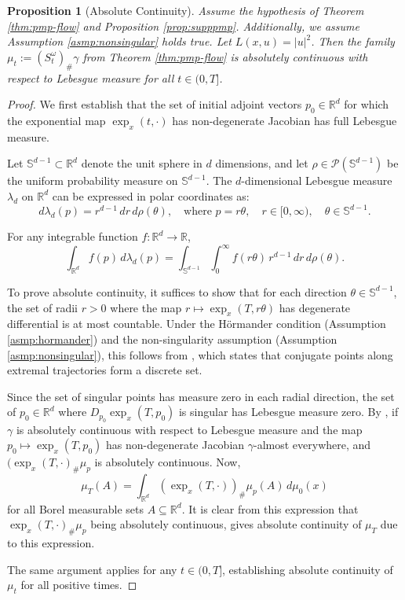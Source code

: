 \documentclass{article}
\newtheorem{proposition}[theorem]{Proposition}
\newcommand{\Rd}{\mathbb{R}^d}
\begin{document}
\begin{proposition}[Absolute Continuity]
\label{prop:absolute-continuity}
Assume the hypothesis of Theorem \ref{thm:pmp-flow} and Proposition \ref{prop:supppmp}. Additionally,  we assume Assumption \ref{asmp:nonsingular} holds true. Let $L(x,u) = |u|^2$.  Then the family $\mu_t := (S^{\omega}_t)_{\#}\gamma$ from Theorem \ref{thm:pmp-flow} is absolutely continuous with respect to Lebesgue measure for all $t \in (0,T]$.
\end{proposition}

\begin{proof}
We first establish that the set of initial adjoint vectors $p_0 \in \mathbb{R}^d$ for which the exponential map $\exp_x(t, \cdot)$ has non-degenerate Jacobian has full Lebesgue measure. 

Let $\mathbb{S}^{d-1} \subset \mathbb{R}^d$ denote the unit sphere in $d$ dimensions, and let $\rho \in \mathcal{P}(\mathbb{S}^{d-1})$ be the uniform probability measure on $\mathbb{S}^{d-1}$. The $d$-dimensional Lebesgue measure $\lambda_d$ on $\mathbb{R}^d$ can be expressed in polar coordinates as:
\[d\lambda_d(p) = r^{d-1} \, dr \, d\rho(\theta), \quad \text{where } p = r\theta, \quad r \in [0, \infty), \quad \theta \in \mathbb{S}^{d-1}.\]

For any integrable function $f: \mathbb{R}^d \to \mathbb{R}$,
\[\int_{\mathbb{R}^d} f(p) \, d\lambda_d(p) = \int_{\mathbb{S}^{d-1}} \int_0^\infty f(r\theta) \, r^{d-1} \, dr \, d\rho(\theta).\]

To prove absolute continuity, it suffices to show that for each direction $\theta \in \mathbb{S}^{d-1}$, the set of radii $r > 0$ where the map $r \mapsto \exp_x(T, r\theta)$ has degenerate differential is at most countable. Under the Hörmander condition (Assumption \ref{asmp:hormander}) and the non-singularity assumption (Assumption \ref{asmp:nonsingular}), this follows from \cite[Corollary 8.51]{agrachev2019comprehensive}, which states that conjugate points along extremal trajectories form a discrete set.

Since the set of singular points has measure zero in each radial direction, the set of $p_0 \in \mathbb{R}^d$ where $D_{p_0}\exp_x(T, p_0)$ is singular has Lebesgue measure zero. By \cite[Theorem 9.2.2]{bogachev2010differentiable}, if $\gamma$ is absolutely continuous with respect to Lebesgue measure and the map $p_0 \mapsto \exp_x(T, p_0)$ has non-degenerate Jacobian $\gamma$-almost everywhere, and $ ( \exp_x( T, \cdot)_{\#}\mu_p$ is absolutely continuous.
Now, 
\begin{equation}
\label{eq:kern}
\mu_T(A) = \int_{\mathbb{R}^d} (\exp_x(T, \cdot))_{\#}\mu_p(A) \, d\mu_0(x)
\end{equation}
for all Borel measurable sets $A \subseteq \Rd$.
It is clear from this expression that $\exp_x( T, \cdot)_{\#}\mu_p$ being absolutely continuous, gives absolute continuity of $\mu_T$ due to this expression.

The same argument applies for any $t \in (0,T]$, establishing absolute continuity of $\mu_t$ for all positive times. 
\end{proof}
\end{document}
